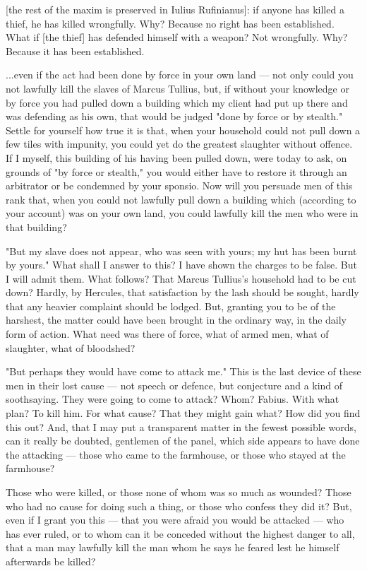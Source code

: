  [the rest of the maxim is preserved in Iulius Rufinianus]: if anyone has killed a thief, he has killed wrongfully. Why? Because no right has been established. What if [the thief] has defended himself with a weapon? Not wrongfully. Why? Because it has been established.

 ...even if the act had been done by force in your own land --- not only could you not lawfully kill the slaves of Marcus Tullius, but, if without your knowledge or by force you had pulled down a building which my client had put up there and was defending as his own, that would be judged "done by force or by stealth." Settle for yourself how true it is that, when your household could not pull down a few tiles with impunity, you could yet do the greatest slaughter without offence. If I myself, this building of his having been pulled down, were today to ask, on grounds of "by force or stealth," you would either have to restore it through an arbitrator or be condemned by your sponsio. Now will you persuade men of this rank that, when you could not lawfully pull down a building which (according to your account) was on your own land, you could lawfully kill the men who were in that building?

 "But my slave does not appear, who was seen with yours; my hut has been burnt by yours." What shall I answer to this? I have shown the charges to be false. But I will admit them. What follows? That Marcus Tullius's household had to be cut down? Hardly, by Hercules, that satisfaction by the lash should be sought, hardly that any heavier complaint should be lodged. But, granting you to be of the harshest, the matter could have been brought in the ordinary way, in the daily form of action. What need was there of force, what of armed men, what of slaughter, what of bloodshed?

 "But perhaps they would have come to attack me." This is the last device of these men in their lost cause --- not speech or defence, but conjecture and a kind of soothsaying. They were going to come to attack? Whom? Fabius. With what plan? To kill him. For what cause? That they might gain what? How did you find this out? And, that I may put a transparent matter in the fewest possible words, can it really be doubted, gentlemen of the panel, which side appears to have done the attacking --- those who came to the farmhouse, or those who stayed at the farmhouse?

 Those who were killed, or those none of whom was so much as wounded? Those who had no cause for doing such a thing, or those who confess they did it? But, even if I grant you this --- that you were afraid you would be attacked --- who has ever ruled, or to whom can it be conceded without the highest danger to all, that a man may lawfully kill the man whom he says he feared lest he himself afterwards be killed?

